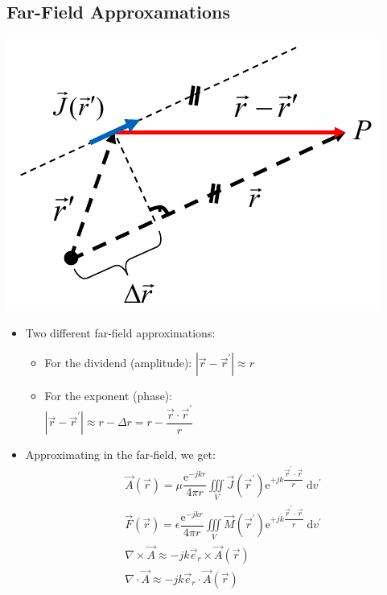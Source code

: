 \subsection{Far-Field Approxamations}
\includegraphics[width=.25\paperheight]{content/aawp/pictures/far-field_approximation.png}
\begin{itemize}
    \itemsep0pt
    \item Two different far-field approximations:\\
        \begin{itemize}
        \itemsep0pt
            \item For the dividend (amplitude): \(|\vec{r} - \vec{r}^\prime| \approx r\)
            \item For the exponent (phase):\\
            \(|\vec{r} - \vec{r}^\prime| \approx r - \Delta r = r - \dfrac{\vec{r} \cdot \vec{r}^\prime}{r}\)
        \end{itemize}
        \item Approximating in the far-field, we get:
            \begin{align*}
                &\vec{A}(\vec{r}) = \mu\dfrac{\mathrm{e}^{-jkr}}{4\pi r} \iiint\limits_V \vec{J}(\vec{r}^\prime) \mathrm{e}^{+jk\dfrac{\vec{r}^\prime \cdot \vec{r}}{r}} \:\mathrm{d}v^\prime\\
                &\vec{F}(\vec{r}) = \epsilon\dfrac{\mathrm{e}^{-jkr}}{4\pi r} \iiint\limits_V \vec{M}(\vec{r}^\prime) \mathrm{e}^{+jk\dfrac{\vec{r}^\prime \cdot \vec{r}}{r}} \:\mathrm{d}v^\prime\\
                &\nabla\times\vec{A} \approx -jk\vec{e}_r \times \vec{A}(\vec{r})\\
                &\nabla\cdot\vec{A} \approx -jk\vec{e}_r \cdot \vec{A}(\vec{r})\\
            \end{align*}
\end{itemize}
